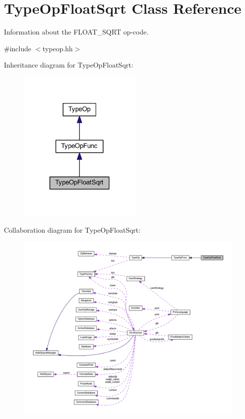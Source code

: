 \hypertarget{class_type_op_float_sqrt}{}\section{Type\+Op\+Float\+Sqrt Class Reference}
\label{class_type_op_float_sqrt}


Information about the F\+L\+O\+A\+T\+\_\+\+S\+Q\+RT op-\/code.  




{\ttfamily \#include $<$typeop.\+hh$>$}



Inheritance diagram for Type\+Op\+Float\+Sqrt\+:
\nopagebreak
\begin{figure}[H]
\begin{center}
\leavevmode
\includegraphics[width=170pt]{class_type_op_float_sqrt__inherit__graph}
\end{center}
\end{figure}


Collaboration diagram for Type\+Op\+Float\+Sqrt\+:
\nopagebreak
\begin{figure}[H]
\begin{center}
\leavevmode
\includegraphics[width=350pt]{class_type_op_float_sqrt__coll__graph}
\end{center}
\end{figure}
